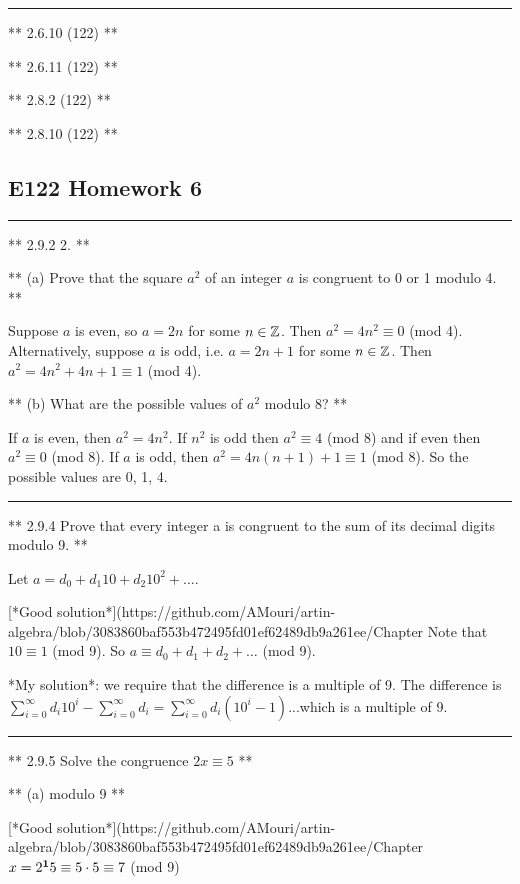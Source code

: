 \hrule


** 2.6.10 (122) **

** 2.6.11 (122) **

** 2.8.2 (122) **

** 2.8.10 (122) **


\subsection{E122 Homework 6}

\hrule
** 2.9.2 2. **

** (a) Prove that the square $a^2$ of an integer $a$ is congruent to 0 or 1 modulo 4. **

Suppose $a$ is even, so $a = 2n$ for some $n \in \mathbb{Z}$. Then $a^2 = 4n^2 \equiv
0$ (mod 4). Alternatively, suppose $a$ is odd, i.e. $a = 2n + 1$ for some $n
\in \mathbb{Z}$. Then $a^2 = 4n^2 + 4n +1 \equiv 1$ (mod 4).

** (b) What are the possible values of $a^2$ modulo 8? **

If $a$ is even, then $a^2 = 4n^2$. If $n^2$ is odd then $a^2 \equiv 4$ (mod 8)
and if even then $a^2 \equiv 0$ (mod 8). If $a$ is odd, then $a^2 = 4n(n+1) + 1
\equiv 1$ (mod 8). So the possible values are 0, 1, 4.


\hrule

** 2.9.4 Prove that every integer a is congruent to the sum of its decimal
digits modulo 9. **

Let $a = d_0 + d_1 10 + d_2 10^2 + \ldots$.

[*Good solution*](https://github.com/AMouri/artin-algebra/blob/3083860baf553b472495fd01ef62489db9a261ee/Chapter%
Note that $10 \equiv 1$ (mod 9). So $a \equiv d_0 + d_1 + d_2 + \ldots$ (mod 9).

*My solution*: we require that the difference is a multiple of 9. The difference
is $\sum_{i=0}^\infty d_i 10^i - \sum_{i=0}^\infty d_i = \sum_{i=0}^\infty
d_i(10^i - 1)$...which is a multiple of 9.


\hrule

** 2.9.5 Solve the congruence $2x \equiv 5$ **

** (a) modulo 9 **

[*Good solution*](https://github.com/AMouri/artin-algebra/blob/3083860baf553b472495fd01ef62489db9a261ee/Chapter%
$x = 2^{\mathbf 1} 5 \equiv 5 \cdot 5 \equiv 7$ (mod 9)


